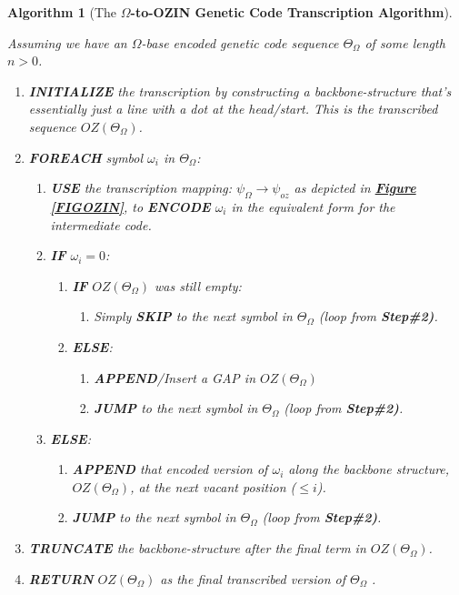 \documentclass[a4paper, 18pt]{book} %
\newtheorem{alg}{Algorithm}
\begin{document}
\begin{alg}[The \textbf{$\Omega$-to-OZIN Genetic Code Transcription Algorithm}]
\label{ALGCOZIN}

Assuming we have an $\Omega$-base encoded genetic code sequence $\Theta_\Omega$ of some length $n > 0$.

\begin{enumerate}
\item \textbf{INITIALIZE} the transcription by constructing a backbone-structure that's essentially just a line with a dot at the head/start. This is the transcribed sequence $OZ(\Theta_\Omega)$.
\item{\textbf{FOREACH} symbol $\omega_i$ in $\Theta_\Omega$: 
\begin{enumerate}
    \item \textbf{USE} the transcription mapping: $\psi_\Omega \rightarrow \psi_{oz}$ as depicted in \textbf{\hyperref[FIGOZIN]{Figure \ref{FIGOZIN}}}, to \textbf{ENCODE} $\omega_i$  in the equivalent form for the intermediate code.
	\item{\textbf{IF} $\omega_i = 0$:
	\begin{enumerate}
	\item{ \textbf{IF} $OZ(\Theta_\Omega)$ was still empty:
	\begin{enumerate}
		\item Simply \textbf{SKIP} to the next symbol in $\Theta_\Omega$ (loop from \textbf{Step\#2)}.
	\end{enumerate}
		}
		\item{ \textbf{ELSE}: 
		\begin{enumerate}
		\item  \textbf{APPEND}/Insert a GAP in $OZ(\Theta_\Omega)$
		\item \textbf{JUMP} to the next symbol in $\Theta_\Omega$ (loop from \textbf{Step\#2)}.
		\end{enumerate}
		}
	\end{enumerate}
	}
	\item { \textbf{ELSE}:
	\begin{enumerate}
	\item \textbf{APPEND} that encoded version of $\omega_i$ along the backbone structure, $OZ(\Theta_\Omega)$, at the next vacant position ($\leq i$).
	\item \textbf{JUMP} to the next symbol in $\Theta_\Omega$ (loop from \textbf{Step\#2)}.
	\end{enumerate}
	}
\end{enumerate}
}
\item \textbf{TRUNCATE} the backbone-structure after the final term in $OZ(\Theta_\Omega)$.
\item \textbf{RETURN} $OZ(\Theta_\Omega)$ as the final transcribed version of $\Theta_\Omega$ .
\end{enumerate}

\end{alg}
\end{document}
